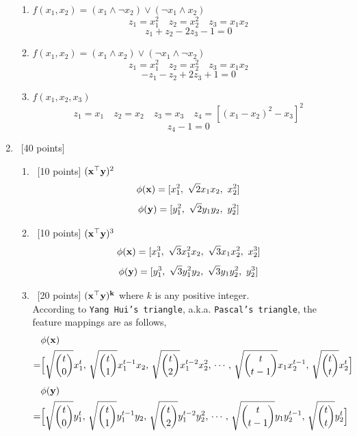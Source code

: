 \documentclass[12pt, fullpage,letterpaper]{article}
\newcommand{\bx}{{\bf x}}
\newcommand{\by}{{\bf y}}
\begin{document}
\begin{enumerate}
\begin{enumerate}
\item $f(x_1, x_2) = (x_1 \land \neg x_2) \lor (\neg x_1 \land x_2)$
$$z_1=x_1^2 \quad z_2=x_2^2 \quad z_3=x_1x_2$$
$$z_1+z_2-2z_3-1=0$$
\item $f(x_1, x_2) = (x_1 \land x_2) \lor (\neg x_1 \land \neg x_2)$
$$z_1=x_1^2 \quad z_2=x_2^2 \quad z_3=x_1x_2$$
$$-z_1-z_2+2z_3+1=0$$
\item $f(x_1, x_2, x_3)$
$$z_1=x_1 \quad z_2=x_2 \quad z_3=x_3 \quad z_4=[(x_1-x_2)^2-x_3]^2$$
$$z_4-1=0$$
\end{enumerate}
\item~[40 points]
\begin{enumerate}
\item~[10 points] $(\bx^\top \by)^2$
$$\phi(\bx) = [x_1^2,\ \sqrt{2}x_1x_2,\ x_2^2]$$
$$\phi(\by) = [y_1^2,\ \sqrt{2}y_1y_2,\ y_2^2]$$
\item~[10 points] $(\bx^\top \by)^3$
$$\phi(\bx) = [x_1^3,\ \sqrt{3}x_1^2x_2,\ \sqrt{3}x_1x_2^2,\ x_2^3]$$
$$\phi(\by) = [y_1^3,\ \sqrt{3}y_1^2y_2,\ \sqrt{3}y_1y_2^2,\ y_2^3]$$
\item~[20 points] $(\bf{x}^\top y)^k$ where $k$ is any positive integer.\\
According to \texttt{Yang Hui's triangle}, a.k.a. \texttt{Pascal's triangle}, the feature mappings are as follows,
\begin{align*}
&\phi(\bx)\\
=&\Big[\sqrt{t\choose0}x_1^t,\,\sqrt{t\choose1}x_1^{t-1}x_2,\,\sqrt{t\choose2}x_1^{t-2}x_2^2,\,\cdots,\,\sqrt{t\choose{t-1}}x_1x_2^{t-1},\,\sqrt{t\choose t}x_2^t\Big]
\end{align*}
\begin{align*}
&\phi(\by)\\
=&\Big[\sqrt{t\choose0}y_1^t,\,\sqrt{t\choose1}y_1^{t-1}y_2,\,\sqrt{t\choose2}y_1^{t-2}y_2^2,\,\cdots,\,\sqrt{t\choose{t-1}}y_1y_2^{t-1},\,\sqrt{t\choose t}y_2^t\Big]
\end{align*}
\end{enumerate}
\end{enumerate}
\end{document}
